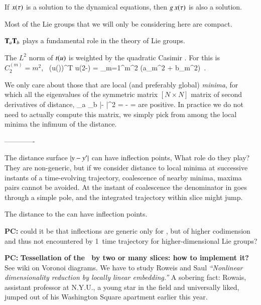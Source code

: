 If $x(\tau)$ is a solution to the dynamical equations, then
$g\,x(\tau)$ is also a solution.

Most of the Lie groups that we will only be considering here are
compact.

$\mathbf{T}_a \mathbf{T}_b$ plays a fundamental role in the theory of Lie groups.

The $L^2$ norm of $t(u)$ is weighted by
the quadratic Casimir . For  this is
$C_2^{(m)} = m^2$,
\beq
\oint {}
     \, (\Lg u(\gSpace))^T \Lg u(2\pi-\gSpace)
= \sum_{m=1}^\infty m^2 \left(a_m^2 + b_m^2\right)
\,.

We only care about those that are local (and preferably global) {\em
minima}, for which all the eigenvalues of the symmetric matrix
$[N\!\times\!N]$ matrix of second derivatives of distance,
\beq
{}
     {\partial \gSpace_a \partial \gSpace_b}
        |\sspRed - \slicep|^2
    =
  - =
are positive. In practice we do not need to actually compute
this matrix, we simply pick from among the local minima
the infimum of the distance.


-------------

The distance surface $|y - {y'}|$ can have inflection points,
What role do they play? They are non-generic, but if we consider distance
to local minima at successive instants of a time-evolving trajectory,
coalescence of
nearby minima, maxima pairs cannot be avoided. At the instant of
coalescence the denominator in  goes through a simple
pole, and the integrated trajectory within slice might jump.

The distance to the {\template} can have inflection points.

{\bf PC:}{ could it be that inflections are generic only for ,
        but of higher codimension and thus not encountered
        by 1\dmn\ time trajectory for higher-dimensional Lie groups?}

{\bf PC:}{
{\bf Tessellation of the \reducedsp\ by two or many slices:
how to implement it?}
See 
{wiki on Voronoi diagrams}.
We have to study Roweis  and Saul
\emph{``Nonlinear dimensionality reduction by locally linear embedding.''}
A sobering fact: Rowais, assistant professor at N.Y.U., a young
star in the field and universally liked, jumped out of his Washington
Square apartment earlier this year.
	}



